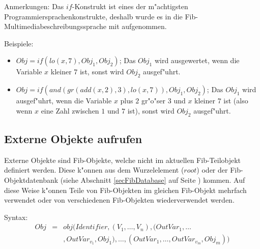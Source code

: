 \bigskip\noindent
Anmerkungen:
Das $if$-Konstrukt ist eines der m"achtigsten Pro\-grammier\-spra\-chen\-kon\-strukte, deshalb wurde es in die Fib-Multi\-media\-beschrei\-bungs\-sprache mit aufgenommen.

\bigskip\noindent
Beispiele:
\begin{itemize}
 \item $Obj=if( lo(x, 7), Obj_1, Obj_2)$; Das $Obj_1$ wird ausgewertet, wenn die Variable $x$ kleiner $7$ ist, sonst wird $Obj_2$ ausgef"uhrt.
 \item $Obj=if( and( gr( add(x, 2), 3), lo(x, 7) ), Obj_1, Obj_2)$; Das $Obj_1$ wird ausgef"uhrt, wenn die Variable $x$ plus $2$ gr"o"ser $3$ und $x$ kleiner $7$ ist (also wenn $x$ eine Zahl zwischen $1$ und $7$ ist), sonst wird $Obj_2$ ausgef"uhrt.
\end{itemize}


\subsection{Externe Objekte aufrufen}
\label{fibExtObject}\label{secExtObjectElement}


Externe Objekte sind Fib-Objekte, welche nicht im aktuellen Fib-Teilobjekt definiert werden. Diese k"onnen aus dem Wurzelelement ($root$) oder der Fib-Objekt\-daten\-bank (siehe Abschnitt \ref{secFibDatabase} auf Seite \pageref{secFibDatabase} ) kommen. Auf diese Weise k"onnen Teile von Fib-Objekten im gleichen Fib-Objekt mehrfach verwendet oder von verschiedenen Fib-Objekten wiederverwendet werden.

\bigskip\noindent
Syntax:
\begin{eqnarray*}
Obj &=& obj( Identifier , ( V_1 , \ldots , V_n ) , ( OutVar_{1}, \ldots  \\
  && ,OutVar_{v_1}, Obj_1), \ldots , ( OutVar_{1}, \ldots ,OutVar_{v_m}, Obj_m) )
\end{eqnarray*}


